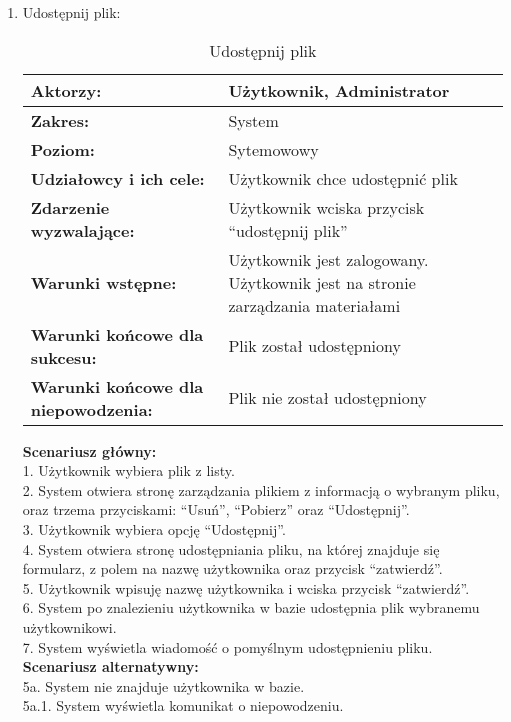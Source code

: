 \begin{enumerate}[label=(\Roman*)]
\item Udostępnij plik:
	\begin{table}[H]
\centering
\caption{Udostępnij plik}
\label{Udostepnijplik}
\begin{tabular}{|p{7cm}|p{7cm}|}
  \hline 
  \textbf{Aktorzy:} & Użytkownik, Administrator\\
  \hline
  \textbf{Zakres:} & System \\
	\hline
  \textbf{Poziom:} & Sytemowowy \\
	\hline
  \textbf{Udziałowcy i ich cele: } & Użytkownik chce udostępnić plik \\
	\hline
  \textbf{Zdarzenie wyzwalające: } & Użytkownik wciska przycisk “udostępnij plik” \\
	\hline
  \textbf{Warunki wstępne: } & Użytkownik jest zalogowany. Użytkownik jest na stronie zarządzania materiałami
 \\
	\hline
  \textbf{Warunki końcowe dla sukcesu:} & Plik został udostępniony
 \\
	\hline
  \textbf{Warunki końcowe dla niepowodzenia:} & Plik nie został udostępniony \\
  \hline
\end{tabular} 
\end{table}

\textbf{Scenariusz główny:}\\
1. Użytkownik wybiera plik z listy.\\
2. System otwiera stronę zarządzania plikiem z informacją o wybranym pliku, oraz trzema przyciskami: “Usuń”, “Pobierz” oraz “Udostępnij”.\\
3. Użytkownik wybiera opcję “Udostępnij”.\\
4. System otwiera stronę udostępniania pliku, na której znajduje się formularz, z polem na nazwę użytkownika oraz przycisk “zatwierdź”.\\
5. Użytkownik wpisuję nazwę użytkownika i wciska przycisk “zatwierdź”.\\
6. System po znalezieniu użytkownika w bazie udostępnia plik wybranemu użytkownikowi.\\
7. System wyświetla wiadomość o pomyślnym udostępnieniu pliku.\\
\textbf{Scenariusz alternatywny:}\\
5a. System nie znajduje użytkownika w bazie.\\
5a.1. System wyświetla komunikat o niepowodzeniu.\\


\end{enumerate}
